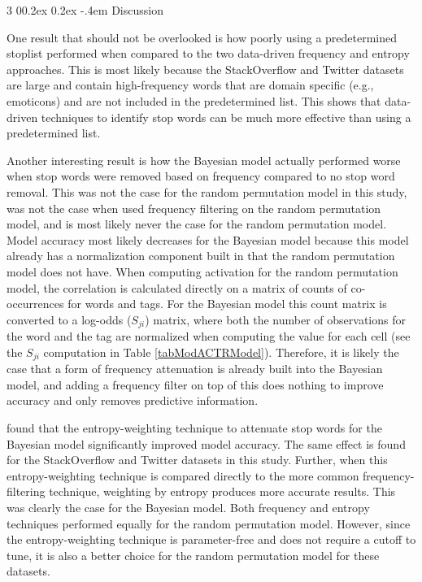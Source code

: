 \documentclass[man,floatsintext,donotrepeattitle]{apa6}
\makeatletter
\renewcommand{\subsubsection}{%
  \@startsection
  {subsubsection}%
  {3}%
  {\parindent}%
  {0\baselineskip \@plus 0.2ex \@minus 0.2ex}%
  {-.4em}%
  {\normalfont\normalsize\bfseries\addperi}}
\makeatother
\begin{document}
\subsubsection{Discussion}

One result that should not be overlooked is how poorly using a predetermined stoplist performed when compared to the two data-driven frequency and entropy approaches.
This is most likely because the StackOverflow and Twitter datasets are large and contain high-frequency words that are domain specific (e.g., emoticons) and are not included in the predetermined list.
This shows that data-driven techniques to identify stop words can be much more effective than using a predetermined list.

Another interesting result is how the Bayesian model actually performed worse when stop words were removed based on frequency compared to no stop word removal.
This was not the case for the random permutation model in this study, was not the case when \textcite{Sahlgren2008} used frequency filtering on the random permutation model,
and is most likely never the case for the random permutation model.
Model accuracy most likely decreases for the Bayesian model because this model already has a normalization component built in that the random permutation model does not have.
When computing activation for the random permutation model, the correlation is calculated directly on a matrix of counts of co-occurrences for words and tags.
For the Bayesian model this count matrix is converted to a log-odds ($S_{ji}$) matrix,
where both the number of observations for the word and the tag are normalized when computing the value for each cell (see the $S_{ji}$ computation in Table \ref{tabModACTRModel}).
Therefore, it is likely the case that a form of frequency attenuation is already built into the Bayesian model,
and adding a frequency filter on top of this does nothing to improve accuracy and only removes predictive information.

\textcite{Stanley2013} found that the entropy-weighting technique to attenuate stop words for the Bayesian model significantly improved model accuracy.
The same effect is found for the StackOverflow and Twitter datasets in this study.
Further, when this entropy-weighting technique is compared directly to the more common frequency-filtering technique, weighting by entropy produces more accurate results.
This was clearly the case for the Bayesian model.
Both frequency and entropy techniques performed equally for the random permutation model.
However, since the entropy-weighting technique is parameter-free and does not require a cutoff to tune, it is also a better choice for the random permutation model for these datasets.
\end{document}
